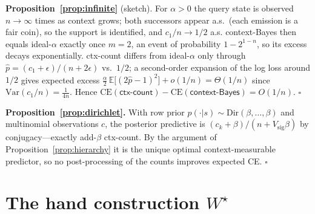 \documentclass{article} %
\newcommand{\ctxcount}{\textsf{ctx-count}}
\newcommand{\ctxbayes}{\textsf{context-Bayes}}
\newcommand{\idealalpha}{\textsf{ideal-$\alpha$}}
\newcommand{\Wstar}{W^{\star}}
\newcommand{\Vsig}{V_{\mathrm{sig}}}
\begin{document}
\textbf{Proposition~\ref{prop:infinite}} (sketch). For $\alpha>0$ the query state is
observed $n\to\infty$ times as context grows; both successors appear a.s.\ (each
emission is a fair coin), so the support is identified, and $c_1/n\to1/2$ a.s.
\ctxbayes{} then equals \idealalpha{} exactly once $m=2$, an event of probability
$1-2^{1-n}$, so its excess decays exponentially. \ctxcount{} differs from
\idealalpha{} only through $\hat p=(c_1+\epsilon)/(n+2\epsilon)$ vs.\ $1/2$; a
second-order expansion of the log loss around $1/2$ gives expected excess
$\tfrac{\alpha}{2}\,\mathbb{E}\big[(2\hat p-1)^2\big]+o(1/n)
=\Theta(1/n)$ since $\mathrm{Var}(c_1/n)=\frac{1}{4n}$. Hence
$\mathrm{CE}(\ctxcount)-\mathrm{CE}(\ctxbayes)=O(1/n)$. \hfill$\square$

\textbf{Proposition~\ref{prop:dirichlet}.} With row prior
$p(\cdot|s)\sim\mathrm{Dir}(\beta,\dots,\beta)$ and multinomial observations $c$,
the posterior predictive is $(c_k+\beta)/(n+\Vsig\beta)$ by conjugacy---exactly
add-$\beta$ \ctxcount{}. By the argument of Proposition~\ref{prop:hierarchy} it is
the unique optimal context-measurable predictor, so no post-processing of the counts
improves expected CE. \hfill$\square$

\section{The hand construction \texorpdfstring{$\Wstar$}{W*}}
\label{app:wstar}
\end{document}
